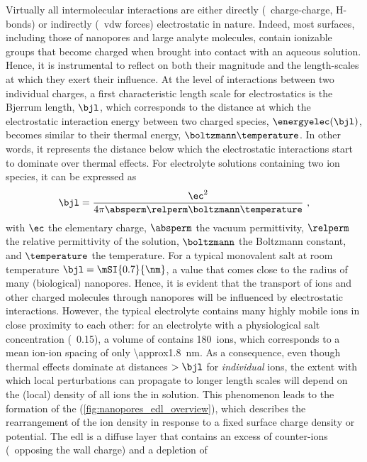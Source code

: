 %

Virtually all intermolecular interactions are either directly (\eg~charge-charge, H-bonds) or indirectly
(\eg~\gls{vdw} forces) electrostatic in nature. Indeed, most surfaces, including those of nanopores and large
analyte molecules, contain ionizable groups that become charged when brought into contact with an aqueous
solution. Hence, it is instrumental to reflect on both their magnitude and the length-scales at which they
exert their influence. At the level of interactions between two individual charges, a first characteristic
length scale for electrostatics is the Bjerrum length, $\bjl$, which corresponds to the distance at which the
electrostatic interaction energy between two charged species, $\energyelec (\bjl)$, becomes similar to their
thermal energy, $\boltzmann \temperature$. In other words, it represents the distance below which the
electrostatic interactions start to dominate over thermal effects. For electrolyte solutions containing two
ion species, it can be expressed as~\cite{Bocquet-2010}
%
\begin{equation}\label{eq:nanopores_bjerrum_length}
  \bjl = \dfrac{\ec^2}{4 \pi \absperm \relperm \boltzmann \temperature}
  \text{ ,}
\end{equation}
%
with $\ec$ the elementary charge, $\absperm$ the vacuum permittivity, $\relperm$ the relative permittivity of
the solution, $\boltzmann$ the Boltzmann constant, and $\temperature$ the temperature. For a typical
monovalent salt at room temperature $\bjl = \mSI{0.7}{\nm}$, a value that comes close to the radius of many
(biological) nanopores. Hence, it is evident that the transport of ions and other charged molecules through
nanopores will be influenced by electrostatic interactions. However, the typical electrolyte contains many
highly mobile ions in close proximity to each other: for an electrolyte with a physiological salt
concentration (\eg~\SI{0.15}{\Molar}), a volume of  contains 180~ions, which
corresponds to a mean ion-ion spacing of only \SI{\approx1.8}{\nm}. As a consequence, even though thermal
effects dominate at distances $>\bjl$ for \emph{individual} ions, the extent with which local perturbations
can propagate to longer length scales will depend on the (local) density of all ions the in solution. This
phenomenon leads to the formation of the  (\cref{fig:nanopores_edl_overview}), which describes
the rearrangement of the ion density in response to a fixed surface charge density or potential. The \gls{edl}
is a diffuse layer that contains an excess of counter-ions (\ie~opposing the wall charge) and a depletion of
